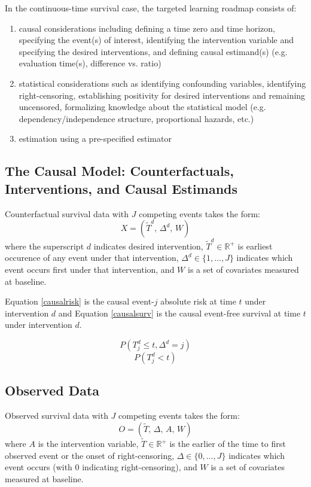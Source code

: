 \documentclass{report}
\newcommand{\1}{\ensuremath{\mathbf{1}}}
\newcommand{\T}{\ensuremath{\widetilde{T}}}
\renewcommand{\L}{\ensuremath{W}}
\begin{document}
In the continuous-time survival case, the targeted learning roadmap consists of:
\begin{enumerate}
  \item causal considerations including defining a time zero and time horizon, specifying the event(s) of interest, identifying the intervention variable and specifying the desired interventions, and defining causal estimand(s) (e.g. evaluation time(s), difference vs. ratio)
  \item statistical considerations such as identifying confounding variables, identifying right-censoring, establishing positivity for desired interventions and remaining uncensored, formalizing knowledge about the statistical model (e.g. dependency/independence structure, proportional hazards, etc.)
  \item estimation using a pre-specified estimator
\end{enumerate}

\subsection{The Causal Model: Counterfactuals, Interventions, and Causal Estimands}
\label{sec:org6810eb5}
Counterfactual survival data with \(J\) competing events takes the form:
\begin{equation}
 X = \left(\T^d,\, \Delta^d,\, \L \right) \label{causaldata}
\end{equation}
where the superscript \(d\) indicates desired intervention, \(\T^d \in \mathbb{R}^+\) is earliest occurence of any event under that intervention, \(\Delta^d \in \{1, \dots, J\}\) indicates which event occurs first under that intervention, and \(\L\) is a set of covariates measured at baseline. 

Equation \eqref{causalrisk} is the causal event-\(j\) absolute risk at time \(t\) under intervention \(d\) and Equation \eqref{causalsurv} is the causal event-free survival at time \(t\) under intervention \(d\).

\begin{equation}
 P(T^d_j \leq t, \Delta^d = j) \label{causalrisk}
\end{equation}
\begin{equation}
 P(T^d_j < t) \label{causalsurv}
\end{equation}

\subsection{Observed Data}
\label{ObservedData}
Observed survival data with \(J\) competing events takes the form:
\begin{equation}
 O = \left(\T,\, \Delta,\, A,\, \L \right) \label{obs-data}
\end{equation}
where \(A\) is the intervention variable, \(\T \in \mathbb{R}^+\) is the earlier of the time to first observed event or the onset of right-censoring, \(\Delta \in \{0, \dots, J\}\) indicates which event occurs (with 0 indicating right-censoring), and \(\L\) is a set of covariates measured at baseline.
\end{document}
